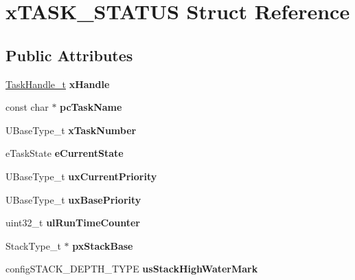 \hypertarget{structx_t_a_s_k___s_t_a_t_u_s}{}\section{x\+T\+A\+S\+K\+\_\+\+S\+T\+A\+T\+US Struct Reference}
\label{structx_t_a_s_k___s_t_a_t_u_s}
\subsection*{Public Attributes}
\begin{DoxyCompactItemize}
\item 
\mbox{\label{structx_t_a_s_k___s_t_a_t_u_s_ac57f825f365c3c64bba827285fe3c2a0}} 
\mbox{\hyperlink{structtsk_task_control_block}{Task\+Handle\+\_\+t}} {\bfseries x\+Handle}
\item 
\mbox{\label{structx_t_a_s_k___s_t_a_t_u_s_ad272663e2560bd9ea088384a39ba6192}} 
const char $\ast$ {\bfseries pc\+Task\+Name}
\item 
\mbox{\label{structx_t_a_s_k___s_t_a_t_u_s_acd44468ba37270b04f83d0833c098057}} 
U\+Base\+Type\+\_\+t {\bfseries x\+Task\+Number}
\item 
\mbox{\label{structx_t_a_s_k___s_t_a_t_u_s_a727e904e3afe49472b0fc6a4e96439cb}} 
e\+Task\+State {\bfseries e\+Current\+State}
\item 
\mbox{\label{structx_t_a_s_k___s_t_a_t_u_s_a39df647234fc0d6de5852042a2741a94}} 
U\+Base\+Type\+\_\+t {\bfseries ux\+Current\+Priority}
\item 
\mbox{\label{structx_t_a_s_k___s_t_a_t_u_s_a692f4c8957b7270f1579cdee63ff287e}} 
U\+Base\+Type\+\_\+t {\bfseries ux\+Base\+Priority}
\item 
\mbox{\label{structx_t_a_s_k___s_t_a_t_u_s_a92ab83f4f376c255dedf8e06a78261f7}} 
uint32\+\_\+t {\bfseries ul\+Run\+Time\+Counter}
\item 
\mbox{\label{structx_t_a_s_k___s_t_a_t_u_s_a0ee59674d2cc57d3a5a29c777d5452ed}} 
Stack\+Type\+\_\+t $\ast$ {\bfseries px\+Stack\+Base}
\item 
\mbox{\label{structx_t_a_s_k___s_t_a_t_u_s_aaad57afd4a629d2404e1cff97891c571}} 
config\+S\+T\+A\+C\+K\+\_\+\+D\+E\+P\+T\+H\+\_\+\+T\+Y\+PE {\bfseries us\+Stack\+High\+Water\+Mark}
\end{DoxyCompactItemize}



